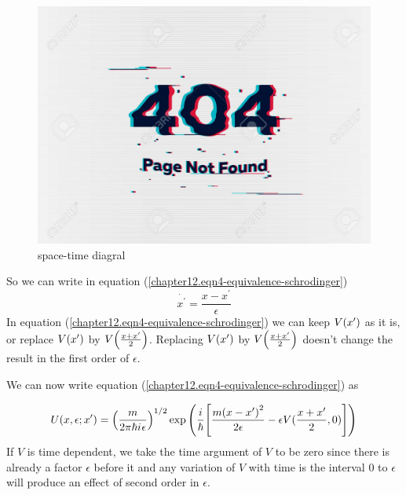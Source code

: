 	
	\begin{figure}
		\centering
		\includegraphics[width=0.5\linewidth]{Pictures/not-found.jpg}
		\caption{space-time diagral}
	\end{figure}
	So we can write in equation (\ref{chapter12.eqn4-equivalence-schrodinger})
	\begin{equation}
		\dot{x^\prime} = \frac{x-x^\prime}{\epsilon}
	\end{equation}
	In equation (\ref{chapter12.eqn4-equivalence-schrodinger}) we can keep $V\qty(x^\prime)$ as it is, or replace $V\qty(x^\prime)$ by $V\qty(\frac{x + x^\prime}{2})$. Replacing $V\qty(x^\prime)$ by $V\qty(\frac{x + x^\prime}{2})$ doesn't change the result in the first order of $\epsilon$.
	
	We can now write equation (\ref{chapter12.eqn4-equivalence-schrodinger}) as
	
	\begin{equation}
		U(x, \epsilon; x^\prime) = \qty(\frac{m}{2\pi \hbar {i\mkern1mu} \epsilon})^{1/2} \exp\qty(\frac{i}{\hbar} \qty[\frac{m\qty(x-x^\prime)^2}{2 \epsilon}  -\epsilon V(\frac{x+x^\prime}{2}, 0)])
		\label{chapter12.eqn5-equivalence-schrodinger}
	\end{equation}
	If $V$ is time dependent, we take the time argument of $V$ to be zero since there is already a factor $\epsilon$ before it and any variation of $V$ with time is the interval $0$ to $\epsilon$ will produce an effect of second order in $\epsilon$.\\
	
